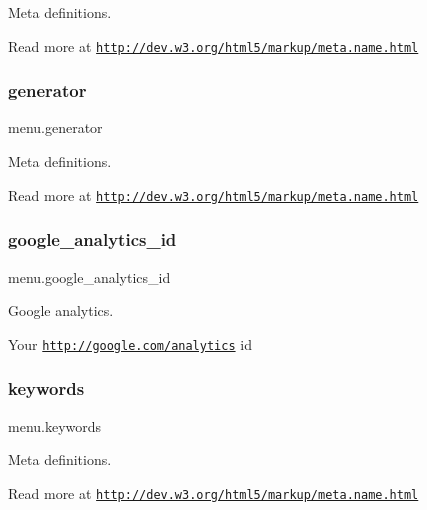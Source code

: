 Meta definitions. 

Read more at \href{http://dev.w3.org/html5/markup/meta.name.html}{\tt http\+://dev.\+w3.\+org/html5/markup/meta.\+name.\+html} \mbox{\label{namespacemenu_ae6ac216b7a7bba4fee339fe4de8a3a1b}} 
\subsubsection{\texorpdfstring{generator}{generator}}
{\footnotesize\ttfamily menu.\+generator}



Meta definitions. 

Read more at \href{http://dev.w3.org/html5/markup/meta.name.html}{\tt http\+://dev.\+w3.\+org/html5/markup/meta.\+name.\+html} \mbox{\label{namespacemenu_a484e0dc2ddf36bc6a4c7afbfec0eba74}} 
\subsubsection{\texorpdfstring{google\+\_\+analytics\+\_\+id}{google\_analytics\_id}}
{\footnotesize\ttfamily menu.\+google\+\_\+analytics\+\_\+id}



Google analytics. 

Your \href{http://google.com/analytics}{\tt http\+://google.\+com/analytics} id \mbox{\label{namespacemenu_a833b19290ee00e303b9e4777c7ac5a98}} 
\subsubsection{\texorpdfstring{keywords}{keywords}}
{\footnotesize\ttfamily menu.\+keywords}



Meta definitions. 

Read more at \href{http://dev.w3.org/html5/markup/meta.name.html}{\tt http\+://dev.\+w3.\+org/html5/markup/meta.\+name.\+html} \mbox{\label{namespacemenu_acd70fc1c344a72f53b7528186d108102}} 

